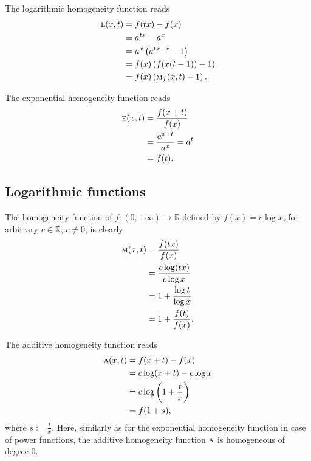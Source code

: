 \documentclass{amsart}
\theoremstyle{plain}
\numberwithin{equation}{section}
\newcommand{\eh}{\textsc{e}}
\newcommand{\R}{{\mathbb{R}}}
\begin{document}
The logarithmic homogeneity function reads
\begin{align*}
	\textsc{l}(x,t)&=f(tx)-f(x)\\
	&={a^{tx}}-{a^{x}}\\
	&=a^x \left(a^{tx-x}-1 \right)\\
	&=f(x) \left(f(x(t-1))-1 \right)\\
	&= f(x) \left(\textsc{m}_f {(x,t)}-1 \right).
\end{align*}


The exponential homogeneity function reads
\begin{align*}
	\eh(x,t)&=\frac{f(x+t)}{f(x)}\\
	&=\frac{a^{x+t}}{a^x}=a^t\\
	&=	f(t).
\end{align*}

\subsection{Logarithmic functions}
The homogeneity function of $f:(0, +\infty) \to \R$ defined by $f(x)=c \log{x}$, for arbitrary $c\in \R$, $c \neq 0$,
is clearly
\begin{align*}
\textsc{m}(x,t)&=\frac{f(tx)}{f(x)}\\
&=\frac{c\log(tx)}{c\log{x}}\\
&= 1+\frac{\log{t}}{\log{x}}\\
&= 1+\frac{f(t)}{f(x)}.
\end{align*}

The additive homogeneity function reads
\begin{align*}
\textsc{a}(x,t)&=f(x+t)-f(x)\\
&={c \log(x+t)}-{c\log{x}}\\
&= c \log{\left(1+\frac{t}{x}\right)}\\
&=  f{\left(1+s\right)},
\end{align*}
where $s:=\frac{t}{x}$.
Here, similarly as for the exponential homogeneity function
in case of power functions,
the additive homogeneity function
$\textsc{a}$ is homogeneous of degree $0$.
 
\end{document}
